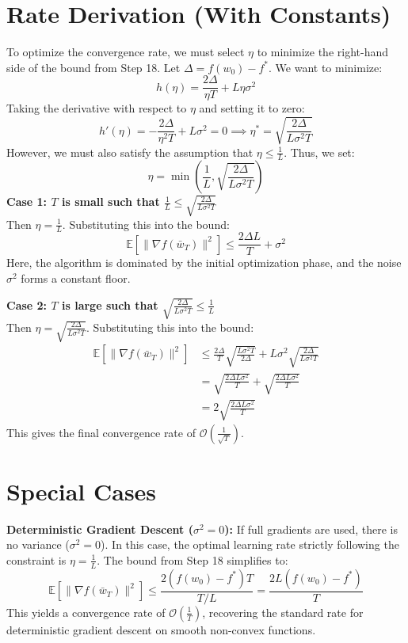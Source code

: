 \documentclass[11pt]{article}
\begin{document}
\section*{Rate Derivation (With Constants)}
To optimize the convergence rate, we must select $\eta$ to minimize the right-hand side of the bound from Step 18.
Let $\Delta = f(w_0) - f^*$. We want to minimize:
$$ h(\eta) = \frac{2\Delta}{\eta T} + L\eta\sigma^2 $$
Taking the derivative with respect to $\eta$ and setting it to zero:
$$ h'(\eta) = -\frac{2\Delta}{\eta^2 T} + L\sigma^2 = 0 \implies \eta^* = \sqrt{\frac{2\Delta}{L\sigma^2 T}} $$
However, we must also satisfy the assumption that $\eta \leq \frac{1}{L}$. Thus, we set:
$$ \eta = \min\left(\frac{1}{L}, \sqrt{\frac{2\Delta}{L\sigma^2 T}}\right) $$
\textbf{Case 1: $T$ is small such that $\frac{1}{L} \leq \sqrt{\frac{2\Delta}{L\sigma^2 T}}$} \\
Then $\eta = \frac{1}{L}$. Substituting this into the bound:
$$ \mathbb{E}[\|\nabla f(\bar{w}_T)\|^2] \leq \frac{2\Delta L}{T} + \sigma^2 $$
Here, the algorithm is dominated by the initial optimization phase, and the noise $\sigma^2$ forms a constant floor.

\textbf{Case 2: $T$ is large such that $\sqrt{\frac{2\Delta}{L\sigma^2 T}} \leq \frac{1}{L}$} \\
Then $\eta = \sqrt{\frac{2\Delta}{L\sigma^2 T}}$. Substituting this into the bound:
\begin{align*}
    \mathbb{E}[\|\nabla f(\bar{w}_T)\|^2] &\leq \frac{2\Delta}{T} \sqrt{\frac{L\sigma^2 T}{2\Delta}} + L\sigma^2 \sqrt{\frac{2\Delta}{L\sigma^2 T}} \\
    &= \sqrt{\frac{2\Delta L \sigma^2}{T}} + \sqrt{\frac{2\Delta L \sigma^2}{T}} \\
    &= 2\sqrt{\frac{2\Delta L \sigma^2}{T}}
\end{align*}
This gives the final convergence rate of $\mathcal{O}\left(\frac{1}{\sqrt{T}}\right)$.

\section*{Special Cases}
\textbf{Deterministic Gradient Descent ($\sigma^2 = 0$):}
If full gradients are used, there is no variance ($\sigma^2 = 0$). In this case, the optimal learning rate strictly following the constraint is $\eta = \frac{1}{L}$. The bound from Step 18 simplifies to:
$$ \mathbb{E}[\|\nabla f(\bar{w}_T)\|^2] \leq \frac{2(f(w_0) - f^*) T}{T/L} = \frac{2L(f(w_0) - f^*)}{T} $$
This yields a convergence rate of $\mathcal{O}\left(\frac{1}{T}\right)$, recovering the standard rate for deterministic gradient descent on smooth non-convex functions.
\end{document}
